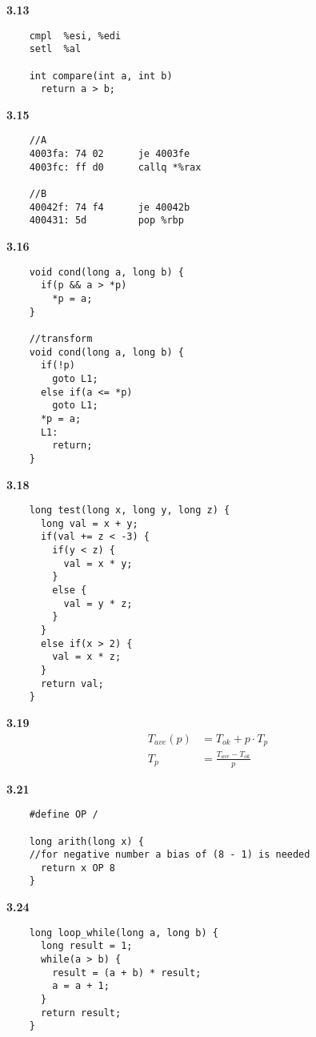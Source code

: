\documentclass[10pt a4paper]{article}
\begin{document}
  \textbf{3.13}
  \begin{lstlisting}
    cmpl  %esi, %edi
    setl  %al

    int compare(int a, int b)
      return a > b;
  \end{lstlisting}

  \textbf{3.15}
  \begin{lstlisting}
    //A
    4003fa: 74 02      je 4003fe
    4003fc: ff d0      callq *%rax

    //B
    40042f: 74 f4      je 40042b
    400431: 5d         pop %rbp
  \end{lstlisting}

  \textbf{3.16}
  \begin{lstlisting}
    void cond(long a, long b) {
      if(p && a > *p)
        *p = a;
    }

    //transform
    void cond(long a, long b) {
      if(!p)
        goto L1;
      else if(a <= *p)
        goto L1;
      *p = a;
      L1:
        return;
    }
  \end{lstlisting}

  \textbf{3.18}
  \begin{lstlisting}
    long test(long x, long y, long z) {
      long val = x + y;
      if(val += z < -3) {
        if(y < z) {
          val = x * y;
        }
        else {
          val = y * z;
        }
      }
      else if(x > 2) {
        val = x * z;
      }
      return val;
    }
  \end{lstlisting}

  \textbf{3.19}
  \begin{equation*}
    \begin{split}
      T_{ave}(p) &= T_{ok} + p \cdot T_{p} \\
      T_{p} &= \frac{T_{ave} - T_{ok}}{p}
    \end{split}
  \end{equation*}

  \textbf{3.21}
  \begin{lstlisting}
    #define OP /

    long arith(long x) {
    //for negative number a bias of (8 - 1) is needed
      return x OP 8
    }
  \end{lstlisting}

  \textbf{3.24}
  \begin{lstlisting}
    long loop_while(long a, long b) {
      long result = 1;
      while(a > b) {
        result = (a + b) * result;
        a = a + 1;
      }
      return result;
    }
  \end{lstlisting}
\end{document}
